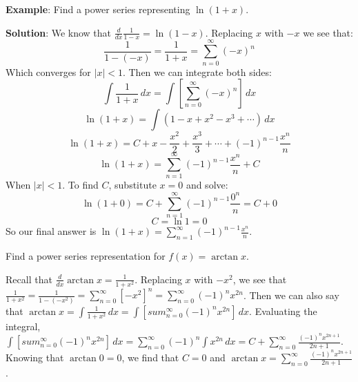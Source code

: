 \textbf{Example}: Find a power series representing $\ln{(1+x)}$. 

\textbf{Solution}: We know that $\frac{d}{dx} \frac{1}{1-x} = \ln{(1-x)}$. 
Replacing $x$ with $-x$ we see that:
$$\frac{1}{1-(-x)} = \frac{1}{1+x} = \sum_{n=0}^\infty (-x)^n$$
Which converges for $|x| < 1$. Then we can integrate both sides:
$$\int \frac{1}{1+x}\,dx = \int \left[ \sum_{n=0}^\infty (-x)^n \right] \,dx$$
$$\ln{(1 + x)} = \int \left( 1 - x + x^2 - x^3 + \cdots \right)\,dx $$
$$\ln{(1 + x)} = C + x - \frac{x^2}{2} + \frac{x^3}{3} + \cdots + (-1)^{n-1} \frac{x^n}{n}$$
$$\ln{(1 + x)} = \sum_{n=1}^\infty (-1)^{n-1} \frac{x^n}{n} + C$$
When $|x|<1$. To find $C$, substitute $x = 0$ and solve:
$$\ln{(1 + 0)} = C + \sum_{n=1}^\infty (-1)^{n-1} \frac{0^n}{n} = C + 0$$
$$C = \ln{1} = 0$$
So our final answer is $\ln{(1 + x)} = \sum_{n=1}^\infty (-1)^{n-1} \frac{x^n}{
n}$. 

\begin{Exercise}[label = seriescalc1]
Find a power series representation for $f(x) = \arctan{x}$. 
\end{Exercise}

\begin{Answer}[ref = seriescalc1]
Recall that $\frac{d}{dx} \arctan{x} = \frac{1}{1+x^2}$. Replacing $x$ with 
$-x^2$, we see that $\frac{1}{1 + x^2} = \frac{1}{1- (-x^2)} = \sum_{n=0}^
\infty \left[ -x^2 \right]^n = \sum_{n=0}^\infty (-1)^n x^{2n}$. Then we can 
also say that $\arctan{x} = \int \frac{1}{1 + x^2}\,dx = \int \left[ sum_{n=0}
^\infty (-1)^n x^{2n} \right]\,dx$. Evaluating the integral, $\int \left[ sum_
{n=0}^\infty (-1)^n x^{2n} \right]\,dx = \sum_{n=0}^\infty (-1)^n \int 
x^{2n}\,dx = C + \sum_{n=0}^\infty \frac{(-1)^n x^{2n+1}}{2n+1}$. Knowing that 
$\arctan{0} = 0$, we find that $C = 0$ and $\arctan{x} = \sum_{n=0}^\infty 
\frac{(-1)^n x^{2n+1}}{2n+1}$. 
\end{Answer}